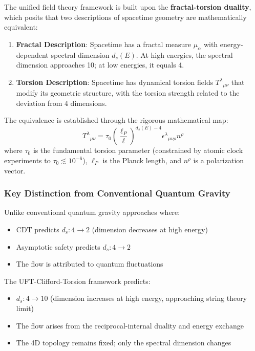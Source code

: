 \documentclass[12pt,a4paper]{article}
\begin{document}
The unified field theory framework \cite{wang2026} is built upon the \textbf{fractal-torsion duality}, which posits that two descriptions of spacetime geometry are mathematically equivalent:

\begin{enumerate}
    \item \textbf{Fractal Description}: Spacetime has a fractal measure $\mu_\alpha$ with energy-dependent spectral dimension $d_s(E)$. At high energies, the spectral dimension approaches 10; at low energies, it equals 4.
    \item \textbf{Torsion Description}: Spacetime has dynamical torsion fields $T^\lambda{}_{\mu\nu}$ that modify its geometric structure, with the torsion strength related to the deviation from 4 dimensions.
\end{enumerate}

The equivalence is established through the rigorous mathematical map:
\begin{equation}
    T^\lambda{}_{\mu\nu} = \tau_0 \left(\frac{\ell_P}{\ell}\right)^{d_s(E)-4} \epsilon^\lambda{}_{\mu\nu\rho} n^\rho
    \label{eq:duality_map}
\end{equation}
where $\tau_0$ is the fundamental torsion parameter (constrained by atomic clock experiments to $\tau_0 \lesssim 10^{-6}$), $\ell_P$ is the Planck length, and $n^\rho$ is a polarization vector.

\subsubsection{Key Distinction from Conventional Quantum Gravity}

Unlike conventional quantum gravity approaches where:
\begin{itemize}
    \item CDT predicts $d_s: 4 \to 2$ (dimension decreases at high energy)
    \item Asymptotic safety predicts $d_s: 4 \to 2$ 
    \item The flow is attributed to quantum fluctuations
\end{itemize}

The UFT-Clifford-Torsion framework predicts:
\begin{itemize}
    \item $d_s: 4 \to 10$ (dimension increases at high energy, approaching string theory limit)
    \item The flow arises from the reciprocal-internal duality and energy exchange
    \item The 4D topology remains fixed; only the spectral dimension changes
\end{itemize}
\end{document}
